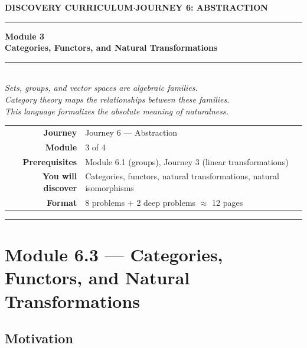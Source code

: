 \documentclass[12pt, a4paper]{article}
\begin{document}
\thispagestyle{empty}
\begin{center}
{\small\color{ModuleColor}\textbf{DISCOVERY CURRICULUM}\quad$\cdot$\quad\textbf{JOURNEY 6: ABSTRACTION}}
\vspace{0.6cm}

{\color{NavyBlue}\rule{\linewidth}{2.5pt}}\vspace{0.5cm}

{\Huge\bfseries\color{NavyBlue}Module 3}\\[0.3cm]
{\LARGE\bfseries\color{ModuleColor}Categories, Functors, and Natural Transformations}\\[0.4cm]
{\color{PuzzleColor}\rule{0.4\linewidth}{1.5pt}}\\[0.4cm]
{\large\itshape\color{NavyBlue!80}
Sets, groups, and vector spaces are algebraic families.\\[0.15cm]
Category theory maps the relationships between these families.\\[0.15cm]
This language formalizes the absolute meaning of naturalness.}

\vspace{1.4cm}
\begin{tabular}{rl}
\textbf{Journey}         & Journey 6 --- Abstraction \\[4pt]
\textbf{Module}          & 3 of 4 \\[4pt]
\textbf{Prerequisites}   & Module 6.1 (groups), Journey 3 (linear transformations) \\[4pt]
\textbf{You will discover} & Categories, functors, natural transformations, natural isomorphisms \\[4pt]
\textbf{Format}          & 8 problems $+$ 2 deep problems $\approx$ 12 pages \\
\end{tabular}
\vspace{1.2cm}

{\color{NavyBlue}\rule{\linewidth}{2.5pt}}
\end{center}

\newpage

\section{Module 6.3 --- Categories, Functors, and Natural Transformations}
\label{sec:mod6.3}

\subsection*{Motivation}
\end{document}
